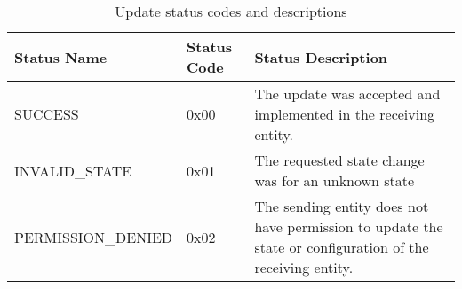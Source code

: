 \documentclass[11pt]{article}
\begin{document}
\begin{table}[h!]
    \centering
    \label{tab:updateStatusCodes}
    \caption{Update status codes and descriptions}
    \begin{tabular}{|p{2in}|p{.8in}|p{3.25in}|}
        \hline
        Status Name & Status Code & Status Description \\
        \hline
        SUCCESS & 0x00 & The update was accepted and implemented in the receiving entity. \\
        \hline
        INVALID\_STATE & 0x01 & The requested state change was for an unknown state \\
        \hline
        PERMISSION\_DENIED & 0x02 & The sending entity does not have permission to update 
        the state or configuration of the receiving entity. \\
        \hline
    \end{tabular}
\end{table}
\end{document}
